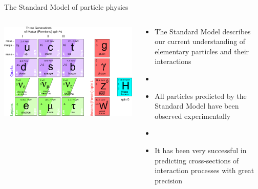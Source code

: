 \documentclass[aspectratio=1610]{beamer}
\begin{document}
\begin{frame}{The Standard Model of particle physics}
\begin{columns}
\begin{column}{0.5\textwidth}
\includegraphics[width=\textwidth]{figs/theory/SM.pdf}
\end{column}
\begin{column}{0.5\textwidth}
\begin{itemize}
\item The Standard Model describes our current understanding of elementary particles and their interactions
\item[]
\item All particles predicted by the Standard Model have been observed experimentally
\item[]
\item It has been very successful in predicting cross-sections of interaction processes with great precision
\end{itemize}
\end{column}
\end{columns}
\end{frame}
\end{document}
